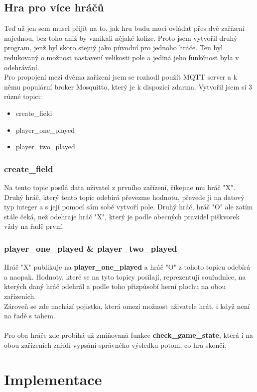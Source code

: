 \documentclass[a4paper,12pt]{article}
\begin{document}
\subsection{Hra pro více hráčů}
Teď už jen sem musel přijít na to, jak hru budu moci ovládat přes dvě zařízení najednou, bez toho aniž by vznikali nějaké kolize. Proto jsem vytvořil druhý program, jenž byl skoro stejný jako původní pro jednoho hráče. Ten byl redukovaný o možnost nastavení velikosti pole a jediná jeho funkčnost byla v odehrávání.\\
Pro propojení mezi dvěma zařízení jsem se rozhodl použít MQTT server a k němu populární broker Mosquitto, který je k dispozici zdarma. Vytvořil jsem si 3 různé topici:
\begin{itemize}
	\item create\_field
	\item player\_one\_played
	\item player\_two\_played
\end{itemize}
\subsubsection{create\_field}
Na tento topic posílá data uživatel z prvního zařízení, říkejme mu hráč "X". Druhý hráč, který tento topic odebírá převezme hodnotu, převede ji na datový typ integer a s její pomocí sám sobě vytvoří pole. Druhý hráč, hráč "O" ale zatím stále čeká, než odehraje hráč "X", který je podle obecných pravidel piškvorek vždy na řadě první.
\subsubsection{player\_one\_played \& player\_two\_played}
Hráč "X" publikuje na \textbf{player\_one\_played} a hráč "O" z tohoto topicu odebírá a naopak. Hodnoty, které se na tyto topicy posílají, reprezentují souřadnice, na kterých daný hráč odehrál a podle toho přizpůsobí herní plochu na obou zařízeních.\\
Zároveň se zde nachází pojistka, která omezí možnost uživatele hrát, i když není na řadě s tahem.
\\
\\
Pro oba hráče zde probíhá už zmiňovaná funkce \textbf{check\_game\_state}, která i na obou zařízeních zařídí vypsání správného výsledku potom, co hra skončí.


\section{Implementace}
\end{document}

